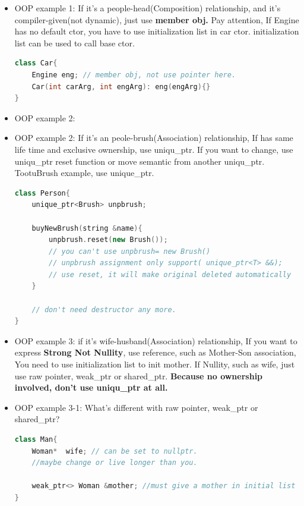 \documentclass[a4paper,11pt,twoside]{book}
\begin{document}
\begin{itemize}
	\item OOP example 1: If it's a people-head(Composition) relationship, and it's compiler-given(not dynamic), just use \textbf{member obj.}   Pay attention, If Engine has no default ctor, you have to use initialization list in car ctor.  initialization list can be used to call base ctor.
\begin{lstlisting}[frame=single, language=c++]
class Car{
	Engine eng; // member obj, not use pointer here.
	Car(int carArg, int engArg): eng(engArg){}
}
	\end{lstlisting}
	
	\item OOP example 2: 
	
	\item OOP example 2:  If it's an peole-brush(Association) relationship, If has same life time and exclusive ownership, use uniqu\_ptr. If you want to change, use uniqu\_ptr reset function or move semantic from another uniqu\_ptr.   TootuBrush example, use unique\_ptr.
\begin{lstlisting}[frame=single, language=c++]
class Person{
	unique_ptr<Brush> unpbrush;
	
	buyNewBrush(string &name){
		unpbrush.reset(new Brush());
		// you can't use unpbrush= new Brush()
		// unpbrush assignment only support( unique_ptr<T> &&);
		// use reset, it will make original deleted automatically
	}
	
	// don't need destructor any more.
}
	\end{lstlisting}
	
	\item OOP example 3: if it's wife-husband(Association) relationship, If you want to express \textbf{Strong Not Nullity}, use reference, such as Mother-Son association, You need to use initialization list to init mother. If Nullity, such as wife, just use raw pointer, weak\_ptr or shared\_ptr. \textbf{Because no ownership involved, don't use uniqu\_ptr at all. }
	
	\item OOP example 3-1: What's different with raw pointer, weak\_ptr or shared\_ptr?
	\begin{lstlisting}[frame=single, language=c++]
class Man{
	Woman*  wife; // can be set to nullptr.
	//maybe change or live longer than you.
	
	weak_ptr<> Woman &mother; //must give a mother in initial list
}
\end{lstlisting}
	

\end{itemize}
\end{document}

